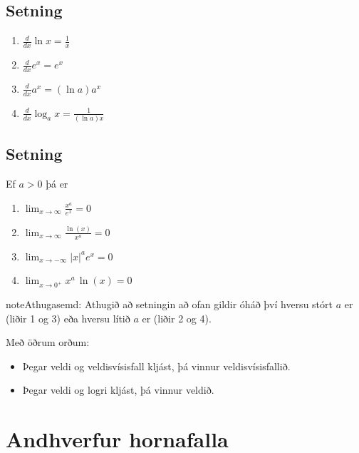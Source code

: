 \documentclass[a4paper,10pt,icelandic]{sphinxmanual}
\begin{document}
\subsection{Setning}
\label{kafli04:id5}\begin{enumerate}
\item {} 
\(\frac{d}{dx}\ln x=\frac 1x\)

\item {} 
\(\frac{d}{dx}e^x=e^x\)

\item {} 
\(\frac{d}{dx}a^x=(\ln a)a^x\)

\item {} 
\(\frac{d}{dx}\log_a x=\frac{1}{(\ln a)x}\)

\end{enumerate}


\subsection{Setning}
\label{kafli04:id6}
Ef \(a>0\) þá er
\begin{enumerate}
\item {} 
\(\lim_{x\to \infty} \frac{x^a}{e^x} = 0\)

\item {} 
\(\lim_{x\to \infty} \frac{\ln(x)}{x^a} = 0\)

\item {} 
\(\lim_{x\to -\infty} |x|^a e^x = 0\)

\item {} 
\(\lim_{x\to 0^+} x^a\, \ln(x) = 0\)

\end{enumerate}

\begin{notice}{note}{Athugasemd:}
Athugið að setningin að ofan gildir óháð því hversu stórt \(a\) er
(liðir 1 og 3) eða hversu lítið \(a\) er (liðir 2 og 4).

Með öðrum orðum:
\begin{itemize}
\item {} 
Þegar veldi og veldisvísisfall kljást, þá vinnur veldisvísisfallið.

\item {} 
Þegar veldi og logri kljást, þá vinnur veldið.

\end{itemize}
\end{notice}


\section{Andhverfur hornafalla}
\label{kafli04:andhverfur-hornafalla}
\end{document}
